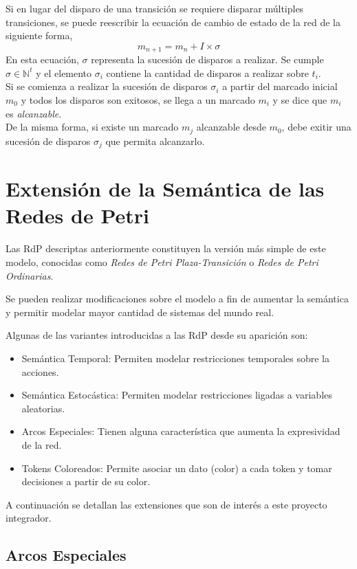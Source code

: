 Si en lugar del disparo de una transición se requiere disparar múltiples
transiciones, se puede reescribir la ecuación de cambio de estado de la red de
la siguiente forma,
$$ m_{n+1} = m_{n} + I \times \sigma $$
En esta ecuación, $\sigma$ representa la sucesión de disparos a realizar. Se
cumple $\sigma \in \mathbb{N}^{t}$ y el elemento $\sigma_{i}$ contiene la
cantidad de disparos a realizar sobre $t_{i}$.\\
Si se comienza a realizar la sucesión de disparos $\sigma_{i}$ a partir del
marcado inicial $m_{0}$ y todos los disparos son exitosos, se llega a un marcado
$m_{i}$ y se dice que $m_{i}$ es \textit{alcanzable}.\\
De la misma forma, si existe un marcado $m_{j}$ alcanzable desde $m_{0}$, debe
exitir una sucesión de disparos $\sigma_{j}$ que permita alcanzarlo.

\section{Extensión de la Semántica de las Redes de Petri}

Las RdP descriptas anteriormente constituyen la versión más simple de este
modelo, conocidas como \textit{Redes de Petri Plaza-Transición} o \textit{Redes
de Petri Ordinarias}.

Se pueden realizar modificaciones sobre el modelo a fin de aumentar la semántica
y permitir modelar mayor cantidad de sistemas del mundo real.

Algunas de las variantes introducidas a las RdP desde su aparición son:
\begin{itemize}
  \item Semántica Temporal: Permiten modelar restricciones temporales sobre la
  acciones.
  \item Semántica Estocástica: Permiten modelar restricciones ligadas a 
  variables aleatorias.
  \item Arcos Especiales: Tienen alguna característica que aumenta la
  expresividad de la red.
  \item Tokens Coloreados: Permite asociar un dato (color) a cada token y tomar
  decisiones a partir de su color.
\end{itemize}
\cite{PetriNetsFundamentals}

A continuación se detallan las extensiones que son de interés a este proyecto
integrador.

\subsection{Arcos Especiales}


